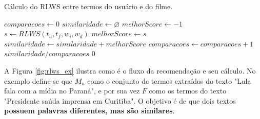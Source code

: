 \begin{algorithm}
	\caption{Cálculo do RLWS entre termos do usuário e do filme.}
	\begin{algorithmic}[1]
        	\State $comparacoes \gets 0$
        	\State $similaridade \gets \varnothing$
        		\State $melhorScore\gets -1$
        			\State $s \gets RLWS(t_u, t_f, w_i, w_d)$
        				\State $melhorScore \gets s$
        			\EndIf
        		\EndFor
        			\State $similaridade \gets similaridade + melhorScore$
        			\State $comparacoes \gets comparacoes + 1$
        		\EndIf
        	\EndFor
				\Return $similaridade / comparacoes$
			\Else
				\Return $0$
			\EndIf
        \EndFunction
    \end{algorithmic}
\end{algorithm}

A Figura \ref{fig:rlws_ex} ilustra como é o fluxo da recomendação e seu cálculo. No exemplo define-se que $M_u$ como o conjunto de termos extraídos do texto "Lula fala com a mídia no Paraná", e por sua vez $F$ como os termos do texto "Presidente saúda imprensa em Curitiba". O objetivo é de que dois textos \textbf{possuem palavras diferentes, mas são similares}.

